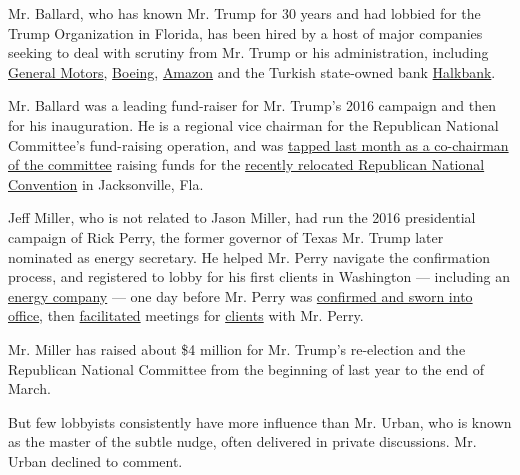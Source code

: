 Mr. Ballard, who has known Mr. Trump for 30 years and had lobbied for
the Trump Organization in Florida, has been hired by a host of major
companies seeking to deal with scrutiny from Mr. Trump or his
administration, including
\href{https://www.nytimes.com/2018/11/27/business/gm-auto-trump.html}{General
Motors},
\href{https://www.nytimes.com/2019/03/12/business/boeing-flights-grounded.html}{Boeing},
\href{https://www.nytimes.com/2018/03/29/us/politics/trump-amazon-taxes.html}{Amazon}
and the Turkish state-owned bank
\href{https://www.nytimes.com/2019/10/15/us/politics/halkbank-turkey-iran-indictment.html}{Halkbank}.

Mr. Ballard was a leading fund-raiser for Mr. Trump's 2016 campaign and
then for his inauguration. He is a regional vice chairman for the
Republican National Committee's fund-raising operation, and was
\href{https://myemail.constantcontact.com/Meet-the-Jacksonville-2020-Host-Committee.html?soid=1134390131943\&aid=AA68sNTVjXE}{tapped
last month as a co-chairman of the committee} raising funds for the
\href{https://www.nytimes.com/2020/06/11/us/politics/trump-jacksonville-rnc-speech.html}{recently
relocated Republican National Convention} in Jacksonville, Fla.

Jeff Miller, who is not related to Jason Miller, had run the 2016
presidential campaign of Rick Perry, the former governor of Texas Mr.
Trump later nominated as energy secretary. He helped Mr. Perry navigate
the confirmation process, and registered to lobby for his first clients
in Washington --- including an
\href{https://soprweb.senate.gov/index.cfm?event=getFilingDetails\&filingID=34C32AFE-4ABB-4101-A6D5-4E0B93A86FEF\&filingTypeID=1}{energy
company} --- one day before Mr. Perry was
\href{https://www.nytimes.com/2017/03/02/us/politics/senate-confirms-rick-perry-as-energy-secretary.html}{confirmed
and sworn into office}, then
\href{https://www.documentcloud.org/documents/4779334-Energy-Secretary-Rick-Perry-Calendars-for-March.html\#p405}{facilitated}
meetings for
\href{https://www.documentcloud.org/documents/4779334-Energy-Secretary-Rick-Perry-Calendars-for-March.html\#p152}{clients}
with Mr. Perry.

Mr. Miller has raised about \$4 million for Mr. Trump's re-election and
the Republican National Committee from the beginning of last year to the
end of March.

But few lobbyists consistently have more influence than Mr. Urban, who
is known as the master of the subtle nudge, often delivered in private
discussions. Mr. Urban declined to comment.

